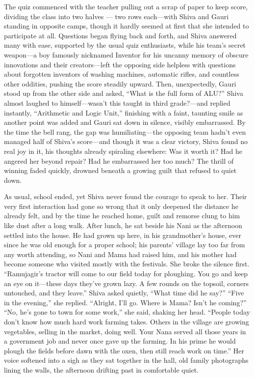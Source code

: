 The quiz commenced with the teacher pulling out a scrap of paper to keep score, dividing the class into two halves — two rows each—with Shiva and Gauri standing in opposite camps, though it hardly seemed at first that she intended to participate at all. Questions began flying back and forth, and Shiva answered many with ease, supported by the usual quiz enthusiasts, while his team's secret weapon—a boy famously nicknamed Inventor for his uncanny memory of obscure innovations and their creators—left the opposing side helpless with questions about forgotten inventors of washing machines, automatic rifles, and countless other oddities, pushing the score steadily upward. Then, unexpectedly, Gauri stood up from the other side and asked, ``What is the full form of ALU?'' Shiva almost laughed to himself—wasn't this taught in third grade?—and replied instantly, ``Arithmetic and Logic Unit,'' finishing with a faint, taunting smile as another point was added and Gauri sat down in silence, visibly embarrassed. By the time the bell rang, the gap was humiliating—the opposing team hadn't even managed half of Shiva's score—and though it was a clear victory, Shiva found no real joy in it, his thoughts already spiraling elsewhere: Was it worth it? Had he angered her beyond repair? Had he embarrassed her too much? The thrill of winning faded quickly, drowned beneath a growing guilt that refused to quiet down.

As usual, school ended, yet Shiva never found the courage to speak to her. Their very first interaction had gone so wrong that it only deepened the distance he already felt, and by the time he reached home, guilt and remorse clung to him like dust after a long walk. After lunch, he sat beside his Nani as the afternoon settled into the house. He had grown up here, in his grandmother's house, ever since he was old enough for a proper school; his parents' village lay too far from any worth attending, so Nani and Mama had raised him, and his mother had become someone who visited mostly with the festivals. She broke the silence first. ``Ramujagir's tractor will come to our field today for ploughing. You go and keep an eye on it—these days they've grown lazy. A few rounds on the topsoil, corners untouched, and they leave.'' Shiva asked quietly, ``What time did he say?'' ``Five in the evening,'' she replied. ``Alright, I'll go. Where is Mama? Isn't he coming?'' ``No, he's gone to town for some work,'' she said, shaking her head. ``People today don't know how much hard work farming takes. Others in the village are growing vegetables, selling in the market, doing well. Your Nana served all those years in a government job and never once gave up the farming. In his prime he would plough the fields before dawn with the oxen, then still reach work on time.'' Her voice softened into a sigh as they sat together in the hall, old family photographs lining the walls, the afternoon drifting past in comfortable quiet.

